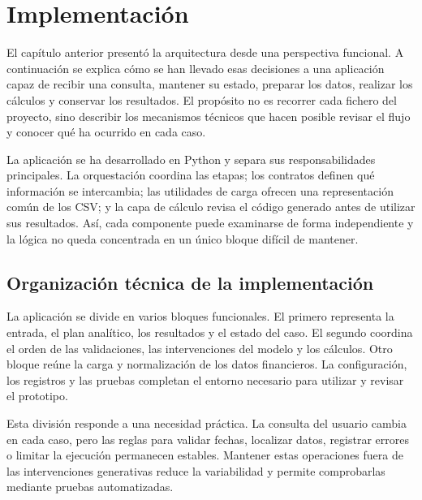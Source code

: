 \chapter{Implementación}

El capítulo anterior presentó la arquitectura desde una perspectiva funcional. A continuación se explica cómo se han llevado esas decisiones a una aplicación capaz de recibir una consulta, mantener su estado, preparar los datos, realizar los cálculos y conservar los resultados. El propósito no es recorrer cada fichero del proyecto, sino describir los mecanismos técnicos que hacen posible revisar el flujo y conocer qué ha ocurrido en cada caso.

La aplicación se ha desarrollado en Python y separa sus responsabilidades principales. La orquestación coordina las etapas; los contratos definen qué información se intercambia; las utilidades de carga ofrecen una representación común de los CSV; y la capa de cálculo revisa el código generado antes de utilizar sus resultados. Así, cada componente puede examinarse de forma independiente y la lógica no queda concentrada en un único bloque difícil de mantener.

\section{Organización técnica de la implementación}

La aplicación se divide en varios bloques funcionales. El primero representa la entrada, el plan analítico, los resultados y el estado del caso. El segundo coordina el orden de las validaciones, las intervenciones del modelo y los cálculos. Otro bloque reúne la carga y normalización de los datos financieros. La configuración, los registros y las pruebas completan el entorno necesario para utilizar y revisar el prototipo.

Esta división responde a una necesidad práctica. La consulta del usuario cambia en cada caso, pero las reglas para validar fechas, localizar datos, registrar errores o limitar la ejecución permanecen estables. Mantener estas operaciones fuera de las intervenciones generativas reduce la variabilidad y permite comprobarlas mediante pruebas automatizadas.


